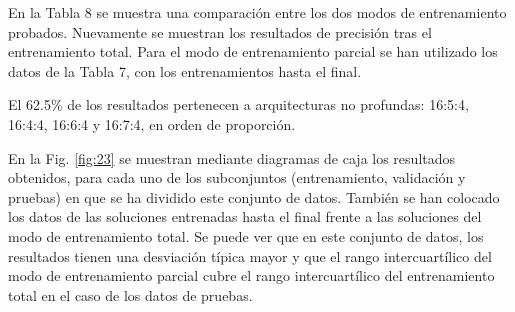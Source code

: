 \documentclass[spanish,a4paper,12pt,twoside]{report}
\begin{document}
  En la Tabla 8 se muestra una comparación entre los dos modos de entrenamiento probados. Nuevamente se muestran los resultados de precisión tras el entrenamiento total. Para el modo de entrenamiento parcial se han utilizado los datos de la Tabla 7, con los entrenamientos hasta el final. \par
  El 62.5\% de los resultados pertenecen a arquitecturas no profundas: 16:5:4, 16:4:4, 16:6:4 y 16:7:4, en orden de proporción. \par
  En la Fig. \ref{fig:23} se muestran mediante diagramas de caja los resultados obtenidos, para cada uno de los subconjuntos (entrenamiento, validación y pruebas) en que se ha dividido este conjunto de datos. También se han colocado los datos de las soluciones entrenadas hasta el final frente a las soluciones del modo de entrenamiento total. Se puede ver que en este conjunto de datos, los resultados tienen una desviación típica mayor y que el rango intercuartílico del modo de entrenamiento parcial cubre el rango intercuartílico del entrenamiento total en el caso de los datos de pruebas. \par
\end{document}
